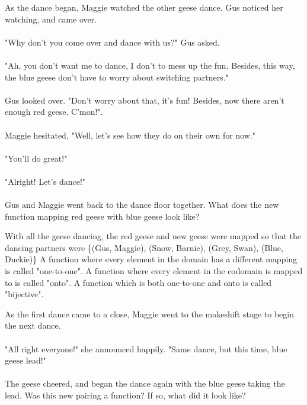 {As the dance began, Maggie watched the other geese dance. Gus noticed her watching, and came over. 
\paragraph{} "Why don't you come over and dance with us?" Gus asked. 
\paragraph{} "Ah, you don't want me to dance, I don't to mess up the fun. Besides, this way, the blue geese don't have to worry about switching partners."
\paragraph{} Gus looked over. "Don't worry about that, it's fun! Besides, now there aren't enough red geese. C'mon!".
\paragraph{} Maggie hesitated, "Well, let's see how they do on their own for now."
\paragraph{} "You'll do great!"
\paragraph{} "Alright! Let's dance!" 
\paragraph{} Gus and Maggie went back to the dance floor together. 
What does the new function mapping red geese with blue geese look like?}
{With all the geese dancing, the red geese and new geese were mapped so that the dancing partners were \{(Gus, Maggie), (Snow, Barnie), (Grey, Swan), (Blue, Duckie)\}}
{A function where every element in the domain has a different mapping is called "one-to-one". A function where every element in the codomain is mapped to is called "onto". A function which is both one-to-one and onto is called "bijective".}
{}
{As the first dance came to a close, Maggie went to the makeshift stage to begin the next dance.  
\paragraph{} "All right everyone!" she announced happily. "Same dance, but this time, blue geese lead!" 
\paragraph{} The geese cheered, and began the dance again with the blue geese taking the lead. Was this new pairing a function? If so, what did it look like?}
